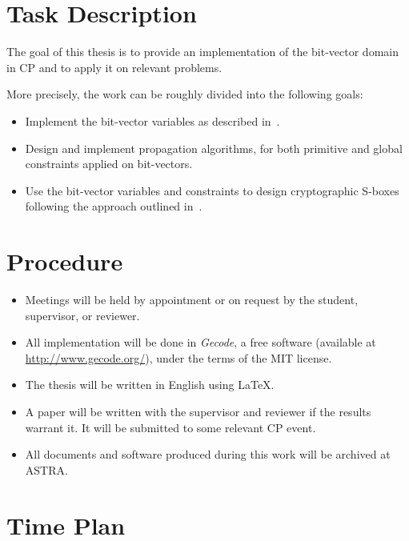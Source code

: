 \documentclass[a4paper,11pt]{article}
\newcommand{\Gecode}{\textit{Gecode}}
\begin{document}
\section*{Task Description}

The goal of this thesis is to provide an implementation of the
bit-vector domain in CP and to apply it on relevant problems.

More precisely, the work can be roughly divided into the following
goals:

\begin{itemize}
\item Implement the bit-vector variables as described in~\cite{bitvectors}. 
\item Design and implement propagation algorithms, for both primitive
  and global constraints applied on bit-vectors.
\item Use the bit-vector variables and constraints to design
  cryptographic S-boxes following the approach outlined in~\cite{sboxes}.
\end{itemize}

\section*{Procedure}

\begin{itemize}
\item Meetings will be held by appointment or on request by the
  student, supervisor, or reviewer. 
\item All implementation will be done in \Gecode, a free software
  (available at \url{http://www.gecode.org/}), under the terms of the
  MIT license.
\item The thesis will be written in English using \LaTeX.
\item A paper will be written with the supervisor and reviewer if the
  results warrant it.  It will be submitted to some relevant CP event.
\item All documents and software produced during this work will be
  archived at ASTRA.
\end{itemize}


\section*{Time Plan}
\end{document}
